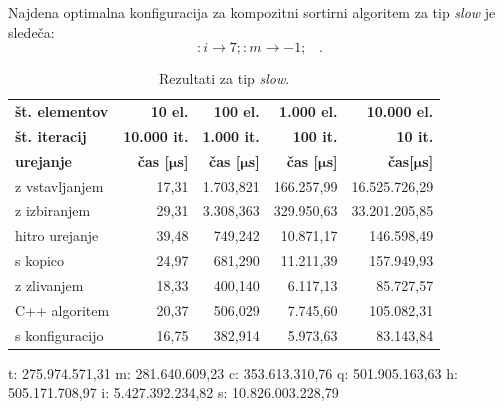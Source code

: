 \documentclass[a4paper,oneside,12pt]{article}
\newcommand{\lra}{\ensuremath{\longrightarrow}}
\newcommand{\edot}{\;\;\;.}
\newcommand{\bmu}{\ensuremath{\boldsymbol{\mu}}}
\newcommand{\usec}{\ensuremath{\bmu}s}
\begin{document}
Najdena optimalna konfiguracija za kompozitni sortirni algoritem za tip \emph{slow} je sledeča:
\[ :i \lra 7;:m \lra -1; \edot \]

\begin{table}[h!]
  \centering
  \caption{Rezultati za tip \emph{slow}.}
  \label{tab:rez:slow} \vspace{1ex}
  \begin{tabular}{l!{\vrule width 1pt}r|r|r|r}
    \bf št. elementov & \bf 10 el.& \bf 100 el.& \bf 1.000 el. & \bf 10.000 el. \\ 
    \bf št. iteracij  & \bf 10.000 it. & \bf 1.000 it. & \bf 100 it. & \bf 10 it. \\ \hline
    \bf urejanje      & \bf čas [\usec] & \bf čas [\usec] & \bf čas [\usec] & \bf čas[\usec] \\  
    z vstavljanjem    & 17,31 & 1.703,821 & 166.257,99 & 16.525.726,29 \\ \hline
    z izbiranjem      & 29,31 & 3.308,363 & 329.950,63 & 33.201.205,85 \\ \hline
    hitro urejanje    & 39,48 &   749,242 &  10.871,17 &   146.598,49  \\ \hline
    s kopico          & 24,97 &   681,290 &  11.211,39 &   157.949,93  \\ \hline
    z zlivanjem       & 18,33 &   400,140 &   6.117,13 &    85.727,57  \\ \hline
    C++ algoritem     & 20,37 &   506,029 &   7.745,60 &   105.082,31  \\ \hline
    s konfiguracijo   & 16,75 &   382,914 &   5.973,63 &    83.143,84  \\ 
  \end{tabular}
\end{table}

t:    275.974.571,31
m:    281.640.609,23
c:    353.613.310,76
q:    501.905.163,63
h:    505.171.708,97
i:  5.427.392.234,82
s: 10.826.003.228,79
\end{document}
